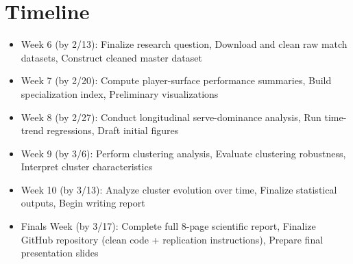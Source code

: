 \documentclass[12pt]{article}
\begin{document}
\section{Timeline}

\begin{itemize}
    \item Week 6 (by 2/13): Finalize research question, Download and clean raw match datasets, Construct cleaned master dataset

    \item Week 7 (by 2/20): Compute player-surface performance summaries, Build specialization index, Preliminary visualizations

    \item Week 8 (by 2/27): Conduct longitudinal serve-dominance analysis, Run time-trend regressions, Draft initial figures

    \item Week 9 (by 3/6): Perform clustering analysis, Evaluate clustering robustness, Interpret cluster characteristics

    \item Week 10 (by 3/13): Analyze cluster evolution over time, Finalize statistical outputs, Begin writing report

    \item Finals Week (by 3/17): Complete full 8-page scientific report, Finalize GitHub repository (clean code + replication instructions), Prepare final presentation slides

\end{itemize} 
\end{document}
